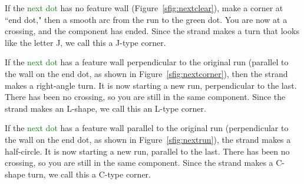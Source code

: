 \documentclass[openany]{book}
\begin{document}
If the \textcolor{green}{next dot} has no feature wall (Figure~\ref{sfig:nextclear}), make a  corner at ``end dot," then a smooth arc from the run to the green dot.  You are now at a crossing, and the component has ended.  Since the strand makes a turn that looks like the letter J, we call this a J-type corner.

If the \textcolor{green}{next dot} has a feature wall perpendicular to the original run (parallel to the wall on the end dot, as shown in  Figure~\ref{sfig:nextcorner}), then the strand makes a right-angle turn. It is now starting a new run, perpendicular to the last. There has been no crossing, so you are still in the same component. Since the strand makes an L-shape, we call this an L-type corner.

If the \textcolor{green}{next dot} has a feature wall parallel to the original run (perpendicular to the wall on the end dot, as shown in  Figure~\ref{sfig:nextrun}), the strand makes a half-circle. It is now starting a new run, parallel to the last.  There has been no crossing, so you are still in the same component. Since the strand makes a C-shape turn, we call this a C-type corner.
\end{document}
